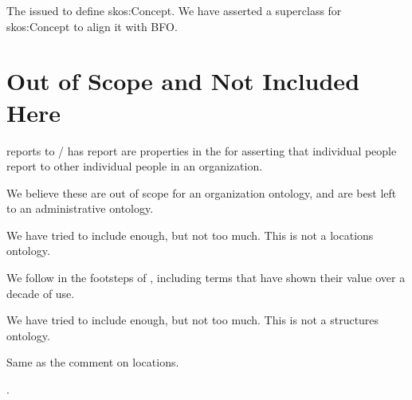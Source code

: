 \documentclass[letterpaper,10pt,english]{sphinxmanual}
\begin{document}
\begin{sphinxShadowBox}

\sphinxAtStartPar
The  issued to define skos:Concept.  We have asserted a superclass for
skos:Concept
to align it with BFO.
\end{sphinxShadowBox}


\section{Out of Scope and Not Included Here}
\label{\detokenize{out-of-scope:out-of-scope-and-not-included-here}}
\begin{sphinxShadowBox}

\sphinxAtStartPar
reports to / has report are properties in the  for
asserting that individual people report to other individual people in an organization.

\sphinxAtStartPar
We believe these are out of scope for an organization ontology, and are best left to
an
administrative ontology.
\end{sphinxShadowBox}

\begin{sphinxShadowBox}

\sphinxAtStartPar
We have tried to include enough, but not too much.  This is not a locations
ontology. %
\begin{footnote}[2]\sphinxAtStartFootnote
We follow in the footsteps of {\hyperref[\detokenize{glossary:glossary}]{}}, including terms that have
shown their value over a decade of use.
%
\end{footnote}
\end{sphinxShadowBox}

\begin{sphinxShadowBox}

\sphinxAtStartPar
We have tried to include enough, but not too much.  This is not a structures
ontology. %
\begin{footnote}[3]\sphinxAtStartFootnote
Same as the comment on locations.
%
\end{footnote}.
\end{sphinxShadowBox}
\end{document}
